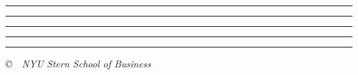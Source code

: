 \documentclass[letterpaper,12pt]{exam}
\begin{document}
\begin{questions}
\begin{parts}
\vspace{0.4cm} \noindent\rule{5.5in}{0.1mm}%

\vspace{0.4cm} \noindent\rule{5.5in}{0.1mm}%

\vspace{0.4cm} \noindent\rule{5.5in}{0.1mm}%

\vspace{0.4cm} \noindent\rule{5.5in}{0.1mm}%

\vspace{0.4cm} \noindent\rule{5.5in}{0.1mm}%


\end{parts}

\end{questions}


\vfill \centerline{\it \copyright \ \number\year \ NYU Stern School
of Business}
\end{document}
